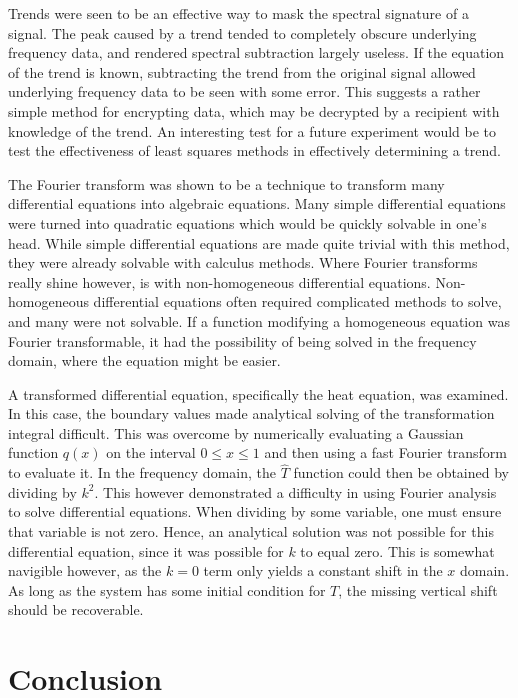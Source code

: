 \documentclass[twocolumn]{article}
\begin{document}
Trends were seen to be an effective way to mask the spectral signature of a signal. The peak caused by a trend tended to completely obscure underlying frequency data, and rendered spectral subtraction largely useless. If the equation of the trend is known, subtracting the trend from the original signal allowed underlying frequency data to be seen with some error. This suggests a rather simple method for encrypting data, which may be decrypted by a recipient with knowledge of the trend. An interesting test for a future experiment would be to test the effectiveness of least squares methods in effectively determining a trend. 

The Fourier transform was shown to be a technique to transform many differential equations into algebraic equations. Many simple differential equations were turned into quadratic equations which would be quickly solvable in one's head. While simple differential equations are made quite trivial with this method, they were already solvable with calculus methods. Where Fourier transforms really shine however, is with non-homogeneous differential equations. Non-homogeneous differential equations often required complicated methods to solve, and many were not solvable. If a function modifying a homogeneous equation was Fourier transformable, it had the possibility of being solved in the frequency domain, where the equation might be easier.

A transformed differential equation, specifically the heat equation, was examined. In this case, the boundary values made analytical solving of the transformation integral difficult. This was overcome by numerically evaluating a Gaussian function $q(x)$ on the interval $0 \leq x \leq 1$ and then using a fast Fourier transform to evaluate it. In the frequency domain, the $\hat{T}$ function could then be obtained by dividing by $k^2$. This however demonstrated a difficulty in using Fourier analysis to solve differential equations. When dividing by some variable, one must ensure that variable is not zero. Hence, an analytical solution was not possible for this differential equation, since it was possible for $k$ to equal zero. This is somewhat navigible however, as the $k=0$ term only yields a constant shift in the $x$ domain. As long as the system has some initial condition for $T$, the missing vertical shift should be recoverable.

\section{Conclusion}
\end{document}

